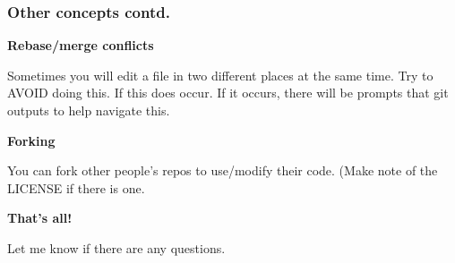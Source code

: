 \documentclass{beamer}
\begin{document}
\begin{frame}
\frametitle{Other concepts contd.}

\textbf{Rebase/merge conflicts}

Sometimes you will edit a file in two different places at the same time. Try to AVOID doing this. If this does occur. If it occurs, there will be prompts that git outputs to help navigate this.

\textbf{Forking}

You can fork other people's repos to use/modify their code. (Make note of the LICENSE if there is one.

\end{frame}

\begin{frame}
\centering
\huge \textbf{That's all!}

\normalsize Let me know if there are any questions.

\end{frame}
\end{document}
